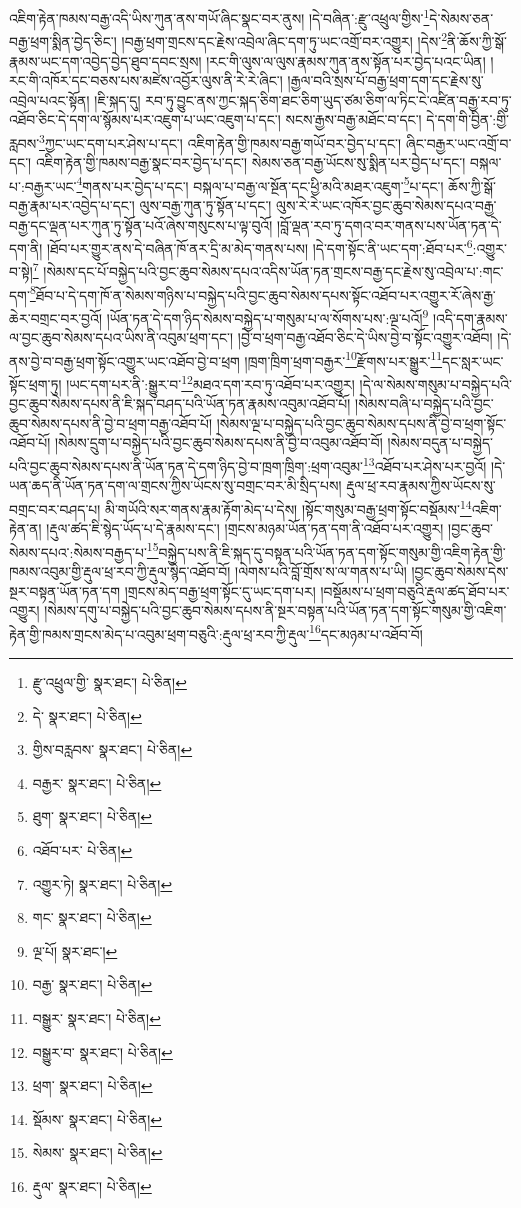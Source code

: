 འཇིག་རྟེན་ཁམས་བརྒྱ་འདི་ཡིས་ཀུན་ནས་གཡོ་ཞིང་སྣང་བར་ནུས། །དེ་བཞིན་:རྫུ་འཕྲུལ་གྱིས་\footnote{རྫུ་འཕྲུལ་གྱི་  སྣར་ཐང་།  པེ་ཅིན། }དེ་སེམས་ཅན་བརྒྱ་ཕྲག་སྨིན་བྱེད་ཅིང་། །བརྒྱ་ཕྲག་གྲངས་དང་རྗེས་འབྲེལ་ཞིང་དག་ཏུ་ཡང་འགྲོ་བར་འགྱུར། །དེས་\footnote{དེ་  སྣར་ཐང་།  པེ་ཅིན། }ནི་ཆོས་ཀྱི་སྒོ་རྣམས་ཡང་དག་འབྱེད་བྱེད་ཐུབ་དབང་སྲས། །རང་གི་ལུས་ལ་ལུས་རྣམས་ཀུན་ནས་སྟོན་པར་བྱེད་པའང་ཡིན། །རང་གི་འཁོར་དང་བཅས་པས་མཛེས་འབྱོར་ལུས་ནི་རེ་རེ་ཞིང་། །རྒྱལ་བའི་སྲས་པོ་བརྒྱ་ཕྲག་དག་དང་རྗེས་སུ་འབྲེལ་པའང་སྟོན། །ཇི་སྐད་དུ། རབ་ཏུ་བྱུང་ནས་ཀྱང་སྐད་ཅིག་ཐང་ཅིག་ཡུད་ཙམ་ཅིག་ལ་ཏིང་ངེ་འཛིན་བརྒྱ་རབ་ཏུ་འཐོབ་ཅིང་དེ་དག་ལ་སྙོམས་པར་འཇུག་པ་ཡང་འཇུག་པ་དང་། སངས་རྒྱས་བརྒྱ་མཐོང་བ་དང་། དེ་དག་གི་བྱིན་:གྱི་རླབས་\footnote{གྱིས་བརླབས་  སྣར་ཐང་།  པེ་ཅིན། }ཀྱང་ཡང་དག་པར་ཤེས་པ་དང་། འཇིག་རྟེན་གྱི་ཁམས་བརྒྱ་གཡོ་བར་བྱེད་པ་དང་། ཞིང་བརྒྱར་ཡང་འགྲོ་བ་དང་། འཇིག་རྟེན་གྱི་ཁམས་བརྒྱ་སྣང་བར་བྱེད་པ་དང་། སེམས་ཅན་བརྒྱ་ཡོངས་སུ་སྨིན་པར་བྱེད་པ་དང་། བསྐལ་པ་:བརྒྱར་ཡང་\footnote{བརྒྱར་  སྣར་ཐང་།  པེ་ཅིན། }གནས་པར་བྱེད་པ་དང་། བསྐལ་པ་བརྒྱ་ལ་སྔོན་དང་ཕྱི་མའི་མཐར་འཇུག་\footnote{ཐུག་  སྣར་ཐང་།  པེ་ཅིན། }པ་དང་། ཆོས་ཀྱི་སྒོ་བརྒྱ་རྣམ་པར་འབྱེད་པ་དང་། ལུས་བརྒྱ་ཀུན་ཏུ་སྟོན་པ་དང་། ལུས་རེ་རེ་ཡང་འཁོར་བྱང་ཆུབ་སེམས་དཔའ་བརྒྱ་བརྒྱ་དང་ལྡན་པར་ཀུན་ཏུ་སྟོན་པའོ་ཞེས་གསུངས་པ་ལྟ་བུའོ། །བློ་ལྡན་རབ་ཏུ་དགའ་བར་གནས་པས་ཡོན་ཏན་དེ་དག་ནི། །ཐོབ་པར་གྱུར་ནས་དེ་བཞིན་ཁོ་ནར་དྲི་མ་མེད་གནས་པས། །དེ་དག་སྟོང་ནི་ཡང་དག་:ཐོབ་པར་\footnote{འཐོབ་པར་  པེ་ཅིན། }:འགྱུར་བ་སྟེ།\footnote{འགྱུར་ཏེ།  སྣར་ཐང་།  པེ་ཅིན། } །སེམས་དང་པོ་བསྐྱེད་པའི་བྱང་ཆུབ་སེམས་དཔའ་འདིས་ཡོན་ཏན་གྲངས་བརྒྱ་དང་རྗེས་སུ་འབྲེལ་པ་:གང་དག་\footnote{གང་  སྣར་ཐང་།  པེ་ཅིན། }ཐོབ་པ་དེ་དག་ཁོ་ན་སེམས་གཉིས་པ་བསྐྱེད་པའི་བྱང་ཆུབ་སེམས་དཔས་སྟོང་འཐོབ་པར་འགྱུར་རོ་ཞེས་རྒྱ་ཆེར་བགྲང་བར་བྱའོ། །ཡོན་ཏན་དེ་དག་ཉིད་སེམས་བསྐྱེད་པ་གསུམ་པ་ལ་སོགས་པས་:ལྔ་པའོ།\footnote{ལྔ་པོ།  སྣར་ཐང་། } །འདི་དག་རྣམས་ལ་བྱང་ཆུབ་སེམས་དཔའ་ཡིས་ནི་འབུམ་ཕྲག་དང་། །བྱེ་བ་ཕྲག་བརྒྱ་འཐོབ་ཅིང་དེ་ཡིས་བྱེ་བ་སྟོང་འགྱུར་འཐོབ། །དེ་ནས་བྱེ་བ་བརྒྱ་ཕྲག་སྟོང་འགྱུར་ཡང་འཐོབ་བྱེ་བ་ཕྲག །ཁྲག་ཁྲིག་ཕྲག་བརྒྱར་\footnote{བརྒྱ་  སྣར་ཐང་།  པེ་ཅིན། }རྫོགས་པར་སྒྱུར་\footnote{བསྒྱུར་  སྣར་ཐང་།  པེ་ཅིན། }དང་སླར་ཡང་སྟོང་ཕྲག་ཏུ། །ཡང་དག་པར་ནི་:སྒྱུར་བ་\footnote{བསྒྱུར་བ་  སྣར་ཐང་།  པེ་ཅིན། }མཐའ་དག་རབ་ཏུ་འཐོབ་པར་འགྱུར། །དེ་ལ་སེམས་གསུམ་པ་བསྐྱེད་པའི་བྱང་ཆུབ་སེམས་དཔས་ནི་ཇི་སྐད་བཤད་པའི་ཡོན་ཏན་རྣམས་འབུམ་འཐོབ་པོ། །སེམས་བཞི་པ་བསྐྱེད་པའི་བྱང་ཆུབ་སེམས་དཔས་ནི་བྱེ་བ་ཕྲག་བརྒྱ་འཐོབ་པོ། །སེམས་ལྔ་པ་བསྐྱེད་པའི་བྱང་ཆུབ་སེམས་དཔས་ནི་བྱེ་བ་ཕྲག་སྟོང་འཐོབ་པོ། །སེམས་དྲུག་པ་བསྐྱེད་པའི་བྱང་ཆུབ་སེམས་དཔས་ནི་བྱེ་བ་འབུམ་འཐོབ་བོ། །སེམས་བདུན་པ་བསྐྱེད་པའི་བྱང་ཆུབ་སེམས་དཔས་ནི་ཡོན་ཏན་དེ་དག་ཉིད་བྱེ་བ་ཁྲག་ཁྲིག་:ཕྲག་འབུམ་\footnote{ཕྲག་  སྣར་ཐང་།  པེ་ཅིན། }འཐོབ་པར་ཤེས་པར་བྱའོ། །དེ་ཡན་ཆད་ནི་ཡོན་ཏན་དག་ལ་གྲངས་ཀྱིས་ཡོངས་སུ་བགྲང་བར་མི་སྲིད་པས། རྡུལ་ཕྲ་རབ་རྣམས་ཀྱིས་ཡོངས་སུ་བགྲང་བར་བཤད་པ། མི་གཡོའི་སར་གནས་རྣམ་རྟོག་མེད་པ་དེས། །སྟོང་གསུམ་བརྒྱ་ཕྲག་སྟོང་བསྡོམས་\footnote{སྡོམས་  སྣར་ཐང་།  པེ་ཅིན། }འཇིག་རྟེན་ན། །རྡུལ་ཚད་ཇི་སྙེད་ཡོད་པ་དེ་རྣམས་དང་། །གྲངས་མཉམ་ཡོན་ཏན་དག་ནི་འཐོབ་པར་འགྱུར། །བྱང་ཆུབ་སེམས་དཔའ་:སེམས་བརྒྱད་པ་\footnote{སེམས་  སྣར་ཐང་།  པེ་ཅིན། }བསྐྱེད་པས་ནི་ཇི་སྐད་དུ་བསྟན་པའི་ཡོན་ཏན་དག་སྟོང་གསུམ་གྱི་འཇིག་རྟེན་གྱི་ཁམས་འབུམ་གྱི་རྡུལ་ཕྲ་རབ་ཀྱི་རྡུལ་སྙེད་འཐོབ་བོ། །ལེགས་པའི་བློ་གྲོས་ས་ལ་གནས་པ་ཡི། །བྱང་ཆུབ་སེམས་དེས་སྔར་བསྟན་ཡོན་ཏན་དག །གྲངས་མེད་བརྒྱ་ཕྲག་སྟོང་དུ་ཡང་དག་པར། །བསྡོམས་པ་ཕྲག་བཅུའི་རྡུལ་ཚད་ཐོབ་པར་འགྱུར། །སེམས་དགུ་པ་བསྐྱེད་པའི་བྱང་ཆུབ་སེམས་དཔས་ནི་སྔར་བསྟན་པའི་ཡོན་ཏན་དག་སྟོང་གསུམ་གྱི་འཇིག་རྟེན་གྱི་ཁམས་གྲངས་མེད་པ་འབུམ་ཕྲག་བཅུའི་:རྡུལ་ཕྲ་རབ་ཀྱི་རྡུལ་\footnote{རྡུལ་  སྣར་ཐང་།  པེ་ཅིན། }དང་མཉམ་པ་འཐོབ་བོ། 